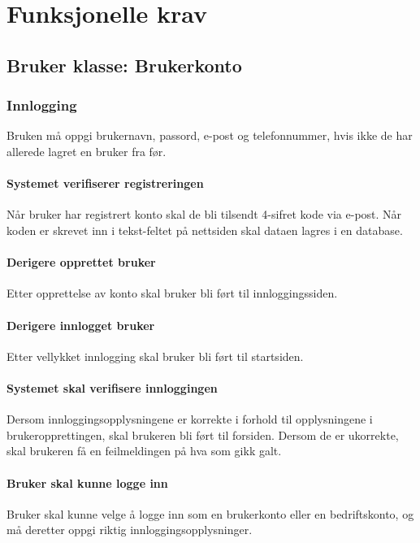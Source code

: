 \documentclass[12pt]{article}
\begin{document}
\section{Funksjonelle krav}

    \subsection{Bruker klasse: Brukerkonto}

        \subsubsection{Innlogging}
            Bruken må oppgi brukernavn, passord, e-post og telefonnummer, hvis ikke de har allerede lagret en bruker fra før.

            \paragraph{Systemet verifiserer registreringen}
            Når bruker har registrert konto skal de bli tilsendt 4-sifret kode via e-post. Når koden er skrevet inn i tekst-feltet på nettsiden skal dataen lagres i en database.

            \paragraph{Derigere opprettet bruker}
            Etter opprettelse av konto skal bruker bli ført til innloggingssiden.

            \paragraph{Derigere innlogget bruker}
            Etter vellykket innlogging skal bruker bli ført til startsiden.

            \paragraph{Systemet skal verifisere innloggingen}
            Dersom innloggingsopplysningene er korrekte i forhold til opplysningene i brukeropprettingen, skal brukeren bli ført til forsiden. Dersom de er ukorrekte, skal brukeren få en feilmeldingen på hva som gikk galt.

            \paragraph{Bruker skal kunne logge inn}
            Bruker skal kunne velge å logge inn som en brukerkonto eller en bedriftskonto, og må deretter oppgi riktig innloggingsopplysninger.
        
\end{document}
